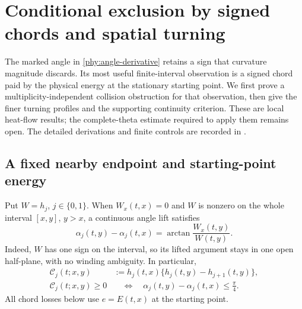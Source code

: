\documentclass[11pt]{article}
\numberwithin{equation}{section}
\theoremstyle{definition}
\theoremstyle{remark}
\begin{document}

\section{Conditional exclusion by signed chords and spatial turning}
\label{phy:turning-criterion}

The marked angle in \eqref{phy:angle-derivative} retains a sign that
curvature magnitude discards.  Its most useful finite-interval observation
is a signed chord paid by the physical energy at the stationary starting
point.  We first prove a multiplicity-independent collision obstruction
for that observation, then give the finer turning profiles and the
supporting continuity criterion.  These are local heat-flow results;
the complete-theta estimate required to apply them remains open.
The detailed derivations and finite controls are recorded in
\cite{ThetaTurning,ThetaChord}.

\subsection{A fixed nearby endpoint and starting-point energy}

Put $W=h_j$, $j\in\{0,1\}$.  When $W_x(t,x)=0$ and $W$ is nonzero
on the whole interval $[x,y]$, $y>x$, a continuous angle lift satisfies
\begin{equation}
 \alpha_j(t,y)-\alpha_j(t,x)
 =\arctan\frac{W_x(t,y)}{W(t,y)}.
 \label{phy:chord-angle}
\end{equation}
Indeed, $W$ has one sign on the interval, so its lifted argument stays
in one open half-plane, with no winding ambiguity.  In particular,
\begin{equation}
 \begin{aligned}
 \mathcal C_j(t;x,y)&:=h_j(t,x)\{h_j(t,y)-h_{j+1}(t,y)\},\\
 \mathcal C_j(t;x,y)\ge0
 &\quad\Longleftrightarrow\quad
 \alpha_j(t,y)-\alpha_j(t,x)\le\frac\pi4.
 \end{aligned}
 \label{phy:chord-observation}
\end{equation}
All chord losses below use $e=E(t,x)$ at the starting point.
\end{document}

